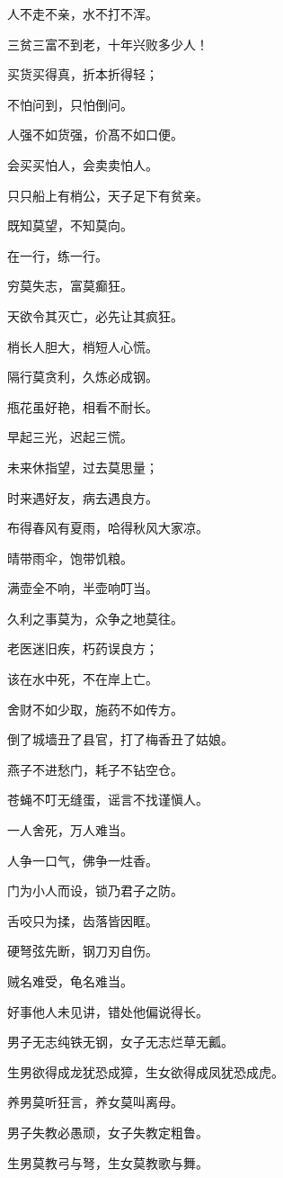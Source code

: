 \documentclass[12pt,oneside]{book}
\begin{document}
人不走不亲，水不打不浑。

三贫三富不到老，十年兴败多少人！

买货买得真，折本折得轻；

不怕问到，只怕倒问。

人强不如货强，价髙不如口便。

会买买怕人，会卖卖怕人。

只只船上有梢公，天子足下有贫亲。

既知莫望，不知莫向。

在一行，练一行。

穷莫失志，富莫癫狂。

天欲令其灭亡，必先让其疯狂。

梢长人胆大，梢短人心慌。

隔行莫贪利，久炼必成钢。

甁花虽好艳，相看不耐长。

早起三光，迟起三慌。

未来休指望，过去莫思量；

时来遇好友，病去遇良方。

布得春风有夏雨，哈得秋风大家凉。

晴带雨伞，饱带饥粮。

满壶全不响，半壶响叮当。

久利之事莫为，众争之地莫往。

老医迷旧疾，朽药误良方；

该在水中死，不在岸上亡。

舍财不如少取，施药不如传方。

倒了城墙丑了县官，打了梅香丑了姑娘。

燕子不进愁门，耗子不钻空仓。

苍蝇不叮无缝蛋，谣言不找谨愼人。

一人舍死，万人难当。

人争一口气，佛争一炷香。

门为小人而设，锁乃君子之防。

舌咬只为揉，齿落皆因眶。

硬弩弦先断，钢刀刃自伤。

贼名难受，龟名难当。

好事他人未见讲，错处他偏说得长。

男子无志纯铁无钢，女子无志烂草无瓤。

生男欲得成龙犹恐成獐，生女欲得成凤犹恐成虎。

养男莫听狂言，养女莫叫离母。

男子失教必愚顽，女子失教定粗鲁。

生男莫教弓与弩，生女莫教歌与舞。
\end{document}
